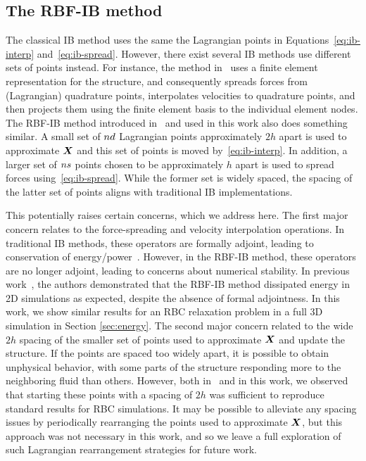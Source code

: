 \subsection{The RBF-IB method}
\label{sec:rbfib}
The classical IB method uses the same the Lagrangian points in Equations~\eqref{eq:ib-interp} and~\eqref{eq:ib-spread}. However, there exist several IB methods
use different sets of points instead. For instance, the method in~\cite{Griffith:2017id} uses a finite element representation for the structure, and consequently spreads forces from (Lagrangian)
quadrature points, interpolates velocities to quadrature points, and then projects them using the finite element basis to the individual element nodes. The RBF-IB method introduced in~\cite{Shankar:2015km} and used in this work also does something similar. A small set of $\data\cardinality$ Lagrangian points approximately $2h$ apart is used to approximate $\boldsymbol{X}$ and this set of points is moved by~\eqref{eq:ib-interp}. In addition, a larger set of $\sample\cardinality$ points chosen to be approximately $h$ apart is used to spread forces using~\eqref{eq:ib-spread}. While the former set is widely spaced, the spacing of the latter set of points aligns with traditional IB implementations.

This potentially raises certain concerns, which we address here. The first major concern relates to the force-spreading and velocity interpolation operations. In traditional IB methods, these operators are formally adjoint, leading to conservation of energy/power~\cite{Peskin:2002go}. However, in the RBF-IB method, these operators are no longer adjoint, leading to concerns about numerical stability. In previous work~\cite{Shankar:2015km}, the authors demonstrated that the RBF-IB method dissipated energy in 2D simulations as expected, despite the absence of formal adjointness. In this work, we show similar results for an RBC relaxation problem in a full 3D simulation in Section \ref{sec:energy}. The second major concern related to the wide $2h$ spacing of the smaller set of points used to approximate $\boldsymbol{X}$ and update the structure. If the points are spaced too widely apart, it is possible to obtain unphysical behavior, with some parts of the structure responding more to the neighboring fluid than others. However, both in~\cite{Shankar:2015km} and in this work, we observed that starting these points with a spacing of $2h$ was sufficient to reproduce standard results for RBC simulations. It may be possible to alleviate any spacing issues by periodically rearranging the points used to approximate $\boldsymbol{X}$, but this approach was not necessary in this work, and so we leave a full exploration of such Lagrangian rearrangement strategies for future work.


